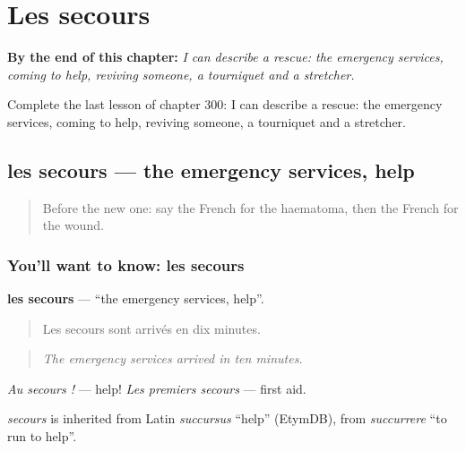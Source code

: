 
\chapter{Les secours}
\label{ch:fr-les-secours}

\begin{chapteropening}
\textbf{By the end of this chapter:} \emph{I can describe a rescue: the emergency services, coming to help, reviving someone, a tourniquet and a stretcher.}

Complete the last lesson of chapter 300: I can describe a rescue: the emergency services, coming to help, reviving someone, a tourniquet and a stretcher.
\end{chapteropening}

\section[les secours]{les secours — the emergency services, help}

\label{lesson:FR-C300-secours}



\begin{quote}
Before the new one: say the French for the haematoma, then the French for the wound.
\end{quote}

\subsection*{You'll want to know: les secours}
\textbf{les secours} — \textquotedblleft{}the emergency services, help\textquotedblright{}.

\begin{quote}
Les secours sont arrivés en dix minutes.
\end{quote}

\begin{quote}
\emph{The emergency services arrived in ten minutes.}
\end{quote}

\emph{Au secours !} — help! \emph{Les premiers secours} — first aid.

\begin{cousinweb}
\emph{secours} is inherited from Latin \emph{succursus} \textquotedblleft{}help\textquotedblright{} (EtymDB), from \emph{succurrere} \textquotedblleft{}to run to help\textquotedblright{}.
\end{cousinweb}

